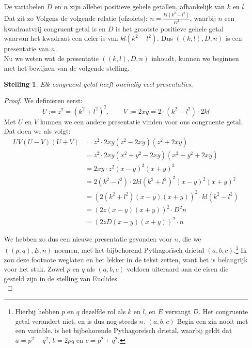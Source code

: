 \documentclass[12pt,reqno]{article}
\theoremstyle{theorem}
\newtheorem{theorem}{Stelling}
\theoremstyle{definition}
\begin{document}
	De {\color{red}variabelen} $D$ en $n$ zijn allebei positieve gehele getallen, afhankelijk van $k$ en $l$. Dat zit zo {\color{red}Volgens de volgende relatie (ofzoiets)}: $n=\frac{kl(k^2-l^2)}{D^2}$, waarbij $n$ een kwadraatvrij congruent getal is en $D$ is het grootste positieve gehele getal waarvan het kwadraat een deler is van $kl(k^2-l^2)$. Dus $((k,l),D,n)$ is een presentatie van $n$.\\
	
	Nu we weten wat de presentatie $((k,l),D,n)$ inhoudt, kunnen we beginnen met het bewijzen van de volgende stelling.	
	\begin{theorem}
		Elk congruent getal heeft oneindig veel presentaties.
	\end{theorem}
	
	\begin{proof}
		We defini\"eren eerst:
		\begin{equation*}
			U:=z^2=(k^2+l^2)^2, \qquad V:=2xy=2\cdot(k^2-l^2)\cdot 2kl
		\end{equation*}
		Met $U$ en $V$ kunnen we een andere presentatie vinden voor ons congruente getal. Dat doen we als volgt:
		\begin{align*}
			UV (U - V) (U + V) &= z^2 \cdot 2xy (z^2 - 2xy) (z^2 + 2xy)\\
			&= z^2 \cdot 2xy (x^2 + y^2 - 2xy) (x^2 + y^2 + 2xy)\\
			&= 2xy \cdot z^2 (x - y)^2 (x + y)^2\\
			&= 2 (k^2-l^2) \cdot 2kl (k^2+l^2)^2 (x - y)^2 (x + y)^2\\
			&= (2 (k^2+l^2) (x-y) (x+y))^2 \cdot kl (k^2-l^2)\\
			&= (2 z (x - y) (x + y))^2 \cdot D^2n\\
			&= (2 z D (x - y) (x + y))^2 \cdot n
		\end{align*}
		
		We hebben zo dus een nieuwe presentatie gevonden voor $n$, die we $((p,q),E,n)$ noemen, met het bijbehorend Pythagor\"isch drietal $(a,b,c)$.\footnote{Hierbij hebben $p$ en $q$ dezelfde rol als $k$ en $l$, en $E$ vervangt $D$. Het congruente getal verandert niet, en is dus nog steeds $n$. $(a,b,c)$ {\color{red}Begin een zin nooit met een variable.} is het bijbehorende Pythagore\"isch drietal, waarbij geldt dat $a=p^2-q^2$, $b=2pq$ en $c=p^2+q^2$.} {\color{red}Ik zou deze footnote weglaten en het lekker in de tekst zetten, want het is belangrijk voor het stuk.} Zowel $p$ en $q$ als $(a,b,c)$ voldoen uiteraard aan de eisen die gesteld zijn in de stelling van Euclides.\\
		

\end{proof}
\end{document}
